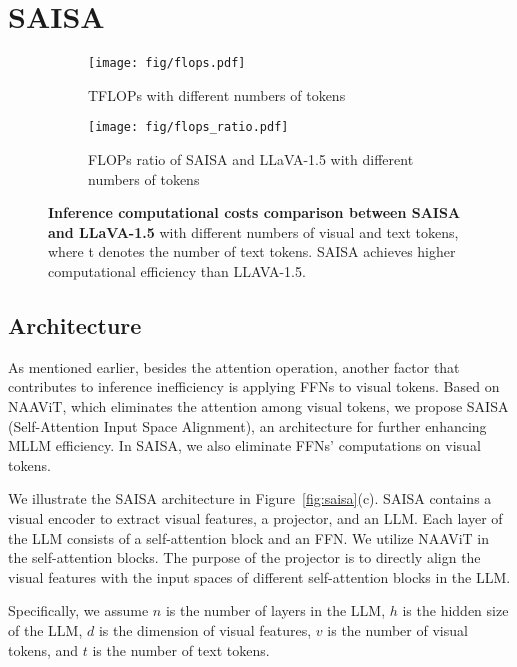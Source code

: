 
\section{SAISA}
\label{sec:4}

\begin{figure*}
  \centering
  \begin{subfigure}{0.49\linewidth}
    \texttt{[image: fig/flops.pdf]}
    \caption{TFLOPs with different numbers of tokens}
    \label{fig:short-a}
  \end{subfigure}
  \hfill
  \begin{subfigure}{0.49\linewidth}
    \texttt{[image: fig/flops\_ratio.pdf]}
    \caption{FLOPs ratio of SAISA and LLaVA-1.5 with different numbers of tokens}
    \label{fig:flops}
  \end{subfigure}
  
  \caption{\textbf{Inference computational costs comparison between SAISA and LLaVA-1.5} with different numbers of visual and text tokens, where t denotes the number of text tokens.
  SAISA achieves higher computational efficiency than LLAVA-1.5.}
  \label{fig:flops}
\end{figure*}

\subsection{Architecture}
As mentioned earlier, besides the attention operation, another factor that contributes to inference inefficiency is applying FFNs to visual tokens.
Based on NAAViT, which eliminates the attention among visual tokens, we propose SAISA (Self-Attention Input Space Alignment), an architecture for further enhancing MLLM efficiency.
In SAISA, we also eliminate FFNs' computations on visual tokens.

We illustrate the SAISA architecture in Figure~\ref{fig:saisa}(c).
SAISA contains a visual encoder to extract visual features, a projector, and an LLM.
Each layer of the LLM consists of a self-attention block and an FFN.
We utilize NAAViT in the self-attention blocks.
The purpose of the projector is to directly align the visual features with the input spaces of different self-attention blocks in the LLM.

Specifically, we assume $n$ is the number of layers in the LLM, $h$ is the hidden size of the LLM, $d$ is the dimension of visual features, $v$ is the number of visual tokens, and $t$ is the number of text tokens.


